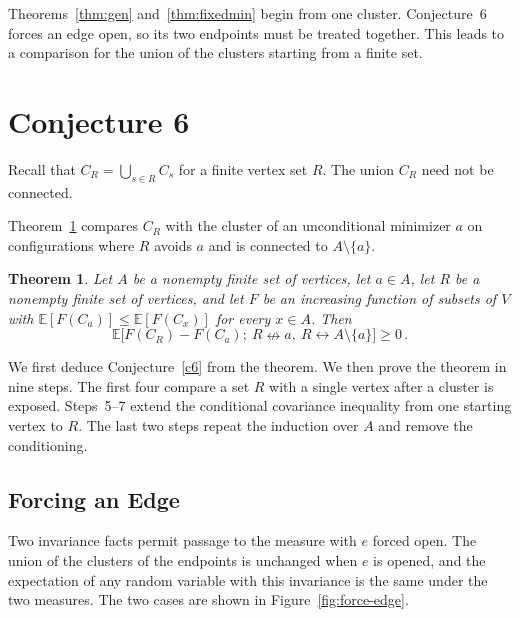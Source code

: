 \documentclass[11pt]{article}
\newtheorem{theorem}{Theorem}[section]
\theoremstyle{definition}
\theoremstyle{remark}
\newcommand{\EE}{\mathbb E}
\newcommand{\con}{\leftrightarrow}
\newcommand{\ncon}{\nleftrightarrow}
\begin{document}
Theorems~\ref{thm:gen} and~\ref{thm:fixedmin} begin from one cluster. Conjecture~6 forces
an edge open, so its two endpoints must be treated together. This leads to a comparison
for the union of the clusters starting from a finite set.

\section{Conjecture 6}\label{sec:c6}

Recall that $C_R=\bigcup_{s\in R}C_s$ for a finite vertex set $R$. The union $C_R$ need
not be connected.

Theorem~\ref{thm:fm2} compares $C_R$ with the cluster of an unconditional minimizer $a$ on
configurations where $R$ avoids $a$ and is connected to $A\setminus\{a\}$.

\begin{theorem}\label{thm:fm2}
Let $A$ be a nonempty finite set of vertices, let $a\in A$, let $R$ be a nonempty finite
set of vertices, and let $F$ be an increasing function of subsets of $V$ with
$\EE[F(C_a)]\le\EE[F(C_x)]$ for every $x\in A$. Then
\begin{equation}\label{eq:fm2}
 \EE\bigl[F(C_R)-F(C_a);\ R\ncon a,\ R\con A\setminus\{a\}\bigr]\geq 0\,.
\end{equation}
\end{theorem}

We first deduce Conjecture~\ref{c6} from the theorem. We then prove the theorem in nine
steps. The first four compare a set $R$ with a single vertex after a cluster is exposed.
Steps~5--7 extend the conditional covariance inequality from one starting vertex to $R$.
The last two steps repeat the induction over $A$ and remove the conditioning.

\subsection{Forcing an Edge}\label{ss:c6red}

Two invariance facts permit passage to the measure with $e$ forced open. The union of the
clusters of the endpoints is unchanged when $e$ is opened, and the expectation of any
random variable with this invariance is the same under the two measures. The two cases
are shown in Figure~\ref{fig:force-edge}.
\end{document}

